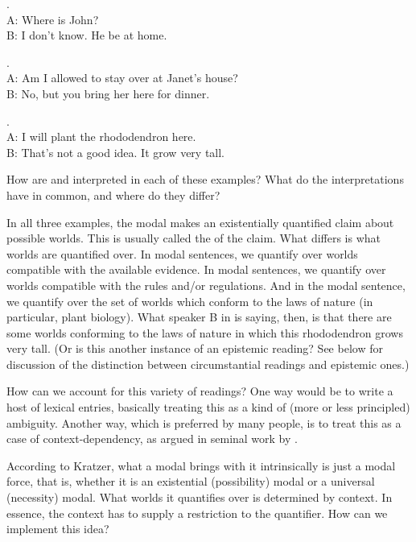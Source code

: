 \ex. \label{epist}\\[6pt]
A: Where is John?\\
B: I don't know. He  be at home.

\ex. \\[6pt]
A: Am I allowed to stay over at Janet's house?\\
B: No, but you  bring her here for dinner.

\ex. \\[6pt]
A: I will plant the rhododendron here.\\
B: That's not a good idea. It  grow very tall.

How are  and  interpreted in each of these examples? What do the interpretations have in common, and where do they differ?

In all three examples, the modal makes an existentially quantified claim about possible worlds. This is usually called the  of the claim. What differs is what worlds are quantified over. In  modal sentences, we quantify over worlds compatible with the available evidence. In  modal sentences, we quantify over worlds compatible with the rules and/or regulations. And in the  modal sentence, we quantify over the set of worlds which conform to the laws of nature (in particular, plant biology). What speaker B in \Last is saying, then, is that there are some worlds conforming to the laws of nature in which this rhododendron grows very tall. (Or is this another instance of an epistemic reading? See below for discussion of the distinction between circumstantial readings and epistemic ones.)

How can we account for this variety of readings? One way would be to write a host of lexical entries, basically treating this as a kind of (more or less principled) ambiguity. Another way, which is preferred by many people, is to treat this as a case of context-dependency, as argued in seminal work by \citet{kratzer:1977:must-can,kratzer:1978:dissertation,kratzer:1981:notional,kratzer:1991:modality}.

According to Kratzer, what a modal brings with it intrinsically is just a modal force, that is, whether it is an existential (possibility) modal or a universal (necessity) modal. What worlds it quantifies over is determined by context. In essence, the context has to supply a restriction to the quantifier. How can we implement this idea?


